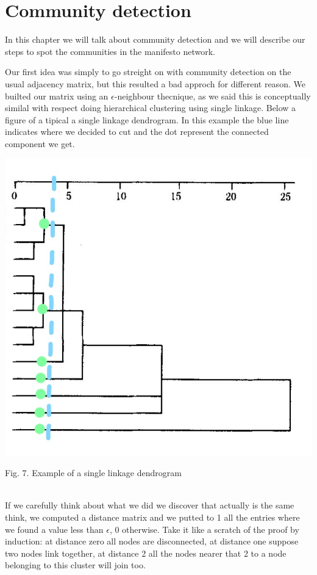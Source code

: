 \documentclass{article}%
\begin{document}
\section*{Community detection}

In this chapter we will talk about community detection and we will describe our steps to spot the communities in the manifesto network.

Our first idea was simply to go streight on with community detection on the usual adjacency matrix, but this resulted a bad approch for different reason.
We builted our matrix using an $\epsilon$-neighbour thecnique, as we said this is conceptually similal with respect doing hierarchical clustering using single linkage. Below a figure of a tipical a single linkage dendrogram.
In this example the blue line indicates where we decided to cut and the dot represent the connected component we get.

\includegraphics[scale=0.5]{Dendrogramma}
\begin{center}
\begin{small}
Fig. 7. Example of a single linkage dendrogram
\end{small}
\end{center}

~
\\

If we carefully think about what we did we discover that actually is the same think, we computed a distance matrix and we putted to 1 all the entries where we found a value less than $\epsilon$, 0 otherwise. Take it like a scratch of the proof by induction: at distance zero all nodes are disconnected, at distance one suppose two nodes link together, at distance 2 all the nodes nearer that 2 to a node belonging to this cluster will join too.
\end{document}

